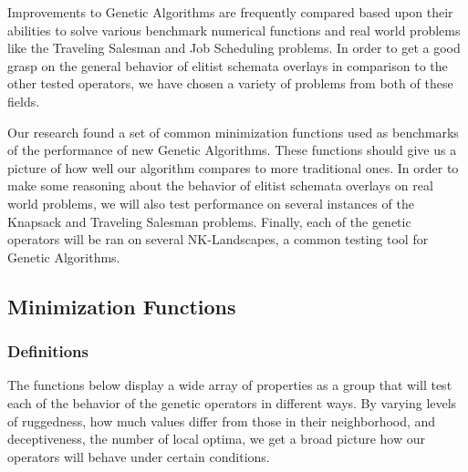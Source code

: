 Improvements to Genetic Algorithms are frequently compared based upon their abilities to solve various benchmark numerical functions and real world problems like the Traveling Salesman and Job Scheduling problems\cite{molga05}. In order to get a good grasp on the general behavior of elitist schemata overlays in comparison to the other tested operators, we have chosen a variety of problems from both of these fields. 

Our research found a set of common minimization functions used as benchmarks of the performance of new Genetic Algorithms\cite{Deb99,Eiben95,Tsutsui99}. These functions should give us a picture of how well our algorithm compares to more traditional ones. In order to make some reasoning about the behavior of elitist schemata overlays on real world problems, we will also test performance on several instances of the Knapsack and Traveling Salesman problems. Finally, each of the genetic operators will be ran on several NK-Landscapes, a common testing tool for Genetic Algorithms.

\subsection*{Minimization Functions}
\subsubsection*{Definitions}

The functions below display a wide array of properties as a group that will test each of the behavior of the genetic operators in different ways. By varying levels of ruggedness, how much values differ from those in their neighborhood, and deceptiveness, the number of local optima, we get a broad picture how our operators will behave under certain conditions.

